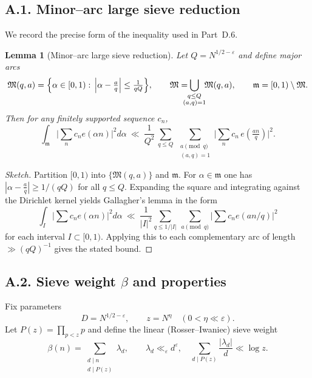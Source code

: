 \documentclass[11pt]{article}
\newtheorem{lemma}{Lemma}[section]
\theoremstyle{definition}
\theoremstyle{remark}
\begin{document}
\subsection*{A.1. Minor--arc large sieve reduction}

We record the precise form of the inequality used in Part~D.6.

\begin{lemma}[Minor--arc large sieve reduction]\label{lem:largesieve-minor}
Let $Q=N^{1/2-\varepsilon}$ and define major arcs
\[
\mathfrak M(q,a)=\Bigl\{\alpha\in[0,1):\,\Big|\alpha-\tfrac{a}{q}\Big|\le \tfrac{1}{qQ}\Bigr\},
\qquad \mathfrak M=\!\!\!\!\!\bigcup_{\substack{q\le Q\\ (a,q)=1}}\!\!\mathfrak M(q,a),
\qquad \mathfrak m=[0,1)\setminus\mathfrak M.
\]
Then for any finitely supported sequence $c_n$,
\[
\int_{\mathfrak m}\Big|\sum_{n}c_n e(\alpha n)\Big|^2 d\alpha
\ \ll\ \frac{1}{Q^2}\,
\sum_{q\le Q}\ \sum_{\substack{a\!\!\!\pmod q\\ (a,q)=1}}
\Big|\sum_{n} c_n\,e\!\left(\tfrac{an}{q}\right)\Big|^2.
\]
\end{lemma}

\begin{proof}[Sketch]
Partition $[0,1)$ into $\{\mathfrak M(q,a)\}$ and $\mathfrak m$. For $\alpha\in\mathfrak m$ one has
$|\alpha-\tfrac aq|\ge 1/(qQ)$ for all $q\le Q$. Expanding the square and integrating against the Dirichlet kernel yields Gallagher’s lemma in the form
\[
\int_{I} \Big|\sum c_n e(\alpha n)\Big|^2 d\alpha
\ \ll\ \frac{1}{|I|^2}\sum_{q\le 1/|I|}\ \sum_{a\pmod q}\Big|\sum c_n e(an/q)\Big|^2
\]
for each interval $I\subset[0,1)$. Applying this to each complementary arc of length $\gg (qQ)^{-1}$ gives the stated bound. 
\end{proof}

\subsection*{A.2. Sieve weight $\beta$ and properties}

Fix parameters
\[
D=N^{1/2-\varepsilon},\qquad z=N^{\eta}\quad(0<\eta\ll \varepsilon).
\]
Let $P(z)=\prod_{p<z}p$ and define the linear (Rosser--Iwaniec) sieve weight
\[
\beta(n)=\sum_{\substack{d\mid n\\ d\mid P(z)}} \lambda_d,\qquad 
\lambda_d\ll_\varepsilon d^{\varepsilon},\quad
\sum_{d\mid P(z)}\frac{|\lambda_d|}{d}\ll \log z.
\]
\end{document}
